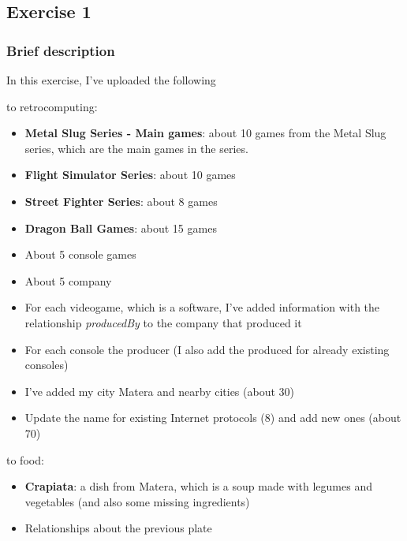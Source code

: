 \subsection{Exercise 1}

\subsubsection{Brief description}


In this exercise, I've uploaded the following 

to retrocomputing:
\begin{itemize}
    \item \textbf{Metal Slug Series - Main games}: about 10 games from the Metal Slug series, which are the main games in the series.
    \item \textbf{Flight Simulator Series}: about 10 games
    \item \textbf{Street Fighter Series}: about 8 games
    \item \textbf{Dragon Ball Games}: about 15 games
    \item About 5 console games
    \item About 5 company
    \item For each videogame, which is a software, I've added information with the relationship \textit{producedBy} to the company that produced it
    \item For each console the producer (I also add the produced for already existing consoles)
    \item I've added my city Matera and nearby cities (about 30)
    \item Update the name for existing Internet protocols (8) and add new ones (about 70)
\end{itemize}

to food:
\begin{itemize}
    \item \textbf{Crapiata}: a dish from Matera, which is a soup made with legumes and vegetables (and also some missing ingredients)
    \item Relationships about the previous plate
\end{itemize}




